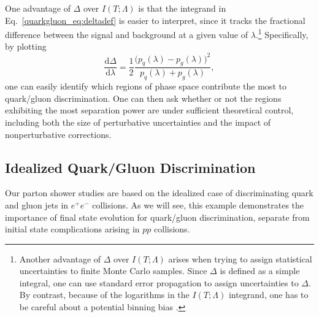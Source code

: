 \documentclass[11pt]{cernrep}
\begin{document}
One advantage of $\Delta$ over $I(T;\Lambda)$ is that the integrand in Eq.~\eqref{quarkgluon_eq:deltadef} is easier to interpret, since it tracks the fractional difference between the signal and background at a given value of $\lambda$.\footnote{Another advantage of $\Delta$ over $I(T; \Lambda)$ arises when trying to assign statistical uncertainties to finite Monte Carlo samples.  Since $\Delta$ is defined as a simple integral, one can use standard error propagation to assign uncertainties to $\Delta$.  By contrast, because of the logarithms in the $I(T; \Lambda)$ integrand, one has to be careful about a potential binning bias \cite{Larkoski:2014pca}.}  Specifically, by plotting 
\begin{equation}
\label{quarkgluon_eq:deltaintegrand}
\frac{\text{d} \Delta}{\text{d} \lambda} = \frac{1}{2} \frac{\bigl(p_q(\lambda) - p_g(\lambda) \bigr)^2}{p_q(\lambda) + p_g(\lambda)},
\end{equation}
one can easily identify which regions of phase space contribute the most to quark/gluon discrimination.  One can then ask whether or not the regions exhibiting the most separation power are under sufficient theoretical control, including both the size of perturbative uncertainties and the impact of nonperturbative corrections.  

\subsection{Idealized Quark/Gluon Discrimination}
\label{quarkgluon_sec:ee}

Our parton shower studies are based on the idealized case of discriminating quark and gluon jets in $e^+ e^-$ collisions.  As we will see, this example demonstrates the importance of final state evolution for quark/gluon discrimination, separate from initial state complications arising in $pp$ collisions.  
\end{document}
